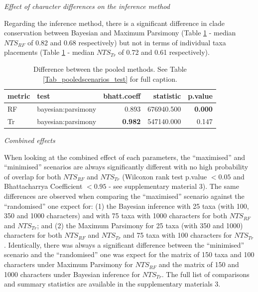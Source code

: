 \documentclass[12pt,letterpaper]{article}
\renewcommand{\subsection}[1]{%
\bigskip
\begin{center}
\begin{large}
\normalfont\itshape #1
\end{large}
\end{center}}
\begin{document}
\subsection{Effect of character differences on the inference method}

Regarding the inference method, there is a significant difference in clade conservation between Bayesian and Maximum Parsimony (Table \ref{Tab_pooledsmethods_test} - median $NTS_{RF}$ of 0.82 and 0.68 respectively) but not in terms of individual taxa placements (Table \ref{Tab_pooledsmethods_test} - median $NTS_{Tr}$ of 0.72 and 0.61 respectively).

\begin{table}[ht]
\centering
\begin{tabular}{llrrr}
  \hline
metric & test & bhatt.coeff & statistic & p.value \\ 
  \hline
RF & bayesian:parsimony & 0.893 & 676940.500 & \textbf{0.000} \\ 
Tr & bayesian:parsimony & \textbf{0.982} & 547140.000 & 0.147 \\ 
   \hline
\end{tabular}
\caption{Difference between the pooled methods. See Table \ref{Tab_pooledscenarios_test} for full caption.} 
\label{Tab_pooledsmethods_test}
\end{table}

\subsection{Combined effects}

When looking at the combined effect of each parameters, the ``maximised'' and ``minimised'' scenarios are always significantly different with no high probability of overlap for both $NTS_{RF}$ and $NTS_{Tr}$ (Wilcoxon rank test p.value $<0.05$ and Bhattacharrya Coefficient $<0.95$ - see supplementary material 3).
The same differences are observed when comparing the ``maximised'' scenario against the ``randomised'' one expect for: (1) the Bayesian inference with 25 taxa (with 100, 350 and 1000 characters) and with 75 taxa with 1000 characters for both $NTS_{RF}$ and $NTS_{Tr}$; and (2) the Maximum Parsimony for 25 taxa (with 350 and 1000) characters for both $NTS_{RF}$ and $NTS_{Tr}$ and 75 taxa with 100 characters for $NTS_{Tr}$.
Identically, there was always a significant difference between the ``minimised'' scenario and the ``randomised'' one was expect for the matrix of 150 taxa and 100 characters under Maximum Parsimony for $NTS_{RF}$ and the matrix of 150 and 1000 characters under Bayesian inference for $NTS_{Tr}$.
The full list of comparisons and summary statistics are available in the supplementary materials 3.
\end{document}
